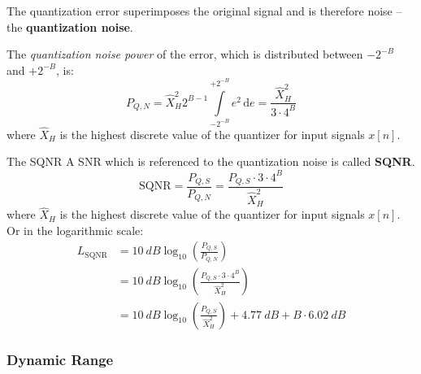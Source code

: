 \begin{refsection}

The quantization error superimposes the original signal and is therefore noise -- the  \textbf{quantization noise}.

The \emph{quantization noise power} of the error, which is distributed between $-2^{-B}$ and $+2^{-B}$, is:
\begin{equation}
	P_{Q,N} = \hat{X}_H^2 2^{B-1} \int\limits_{-2^{-B}}^{+2^{-B}} e^2 \, \mathrm{d} e = \frac{\hat{X}_H^2}{3 \cdot 4^B}
\end{equation}
where $\hat{X}_H$ is the highest discrete value of the quantizer for input signals $x[n]$.

\begin{definition}{The \acf{SQNR}}
	A \ac{SNR} which is referenced to the quantization noise is called  \textbf{\acf{SQNR}}.
	\begin{equation}
		\mathrm{SQNR} = \frac{P_{Q,S}}{P_{Q,N}} = \frac{P_{Q,S} \cdot 3 \cdot 4^B}{\hat{X}_H^2}
	\end{equation}
	where $\hat{X}_H$ is the highest discrete value of the quantizer for input signals $x[n]$.
	Or in the logarithmic scale:
	\begin{equation}
		\begin{split}
			L_{\mathrm{SQNR}} &= \SI{10}{dB} \log_{10}\left(\frac{P_{Q,S}}{P_{Q,N}}\right) \\
			 &= \SI{10}{dB} \log_{10}\left(\frac{P_{Q,S} \cdot 3 \cdot 4^B}{\hat{X}_H^2}\right) \\
			 &= \SI{10}{dB} \log_{10}\left(\frac{P_{Q,S}}{\hat{X}_H^2}\right) + \SI{4.77}{dB} + B \cdot \SI{6.02}{dB}
		\end{split}
	\end{equation}
\end{definition}


\subsubsection{Dynamic Range}


\end{refsection}

